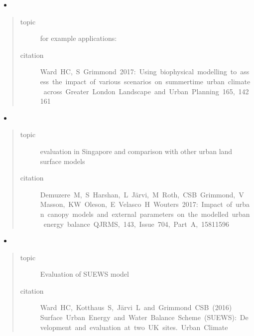 \documentclass[letterpaper,10pt,english]{sphinxmanual}
\begin{document}
\begin{itemize}
\item {} 

\end{itemize}
\begin{quote}\begin{description}
\item[{topic}] \leavevmode
for example applications:

\item[{citation}] \leavevmode
Ward HC, S Grimmond 2017: Using biophysical modelling to assess the impact of various scenarios on summertime urban climate across Greater London Landscape and Urban Planning 165, 142\textendash{}161

\end{description}\end{quote}
\begin{itemize}
\item {} 

\end{itemize}
\begin{quote}\begin{description}
\item[{topic}] \leavevmode
evaluation in Singapore and comparison with other urban land surface models

\item[{citation}] \leavevmode
Demuzere M, S Harshan, L Järvi, M Roth, CSB Grimmond, V Masson, KW Oleson, E Velasco H Wouters 2017: Impact of urban canopy models and external parameters on the modelled urban energy balance QJRMS, 143, Issue 704, Part A, 1581\textendash{}1596

\end{description}\end{quote}
\begin{itemize}
\item {} 

\end{itemize}
\begin{quote}\begin{description}
\item[{topic}] \leavevmode
Evaluation of SUEWS model

\item[{citation}] \leavevmode
Ward HC, Kotthaus S, Järvi L and Grimmond CSB (2016) Surface Urban Energy and Water Balance Scheme (SUEWS): Development and evaluation at two UK sites. Urban Climate

\end{description}\end{quote}
\end{document}
